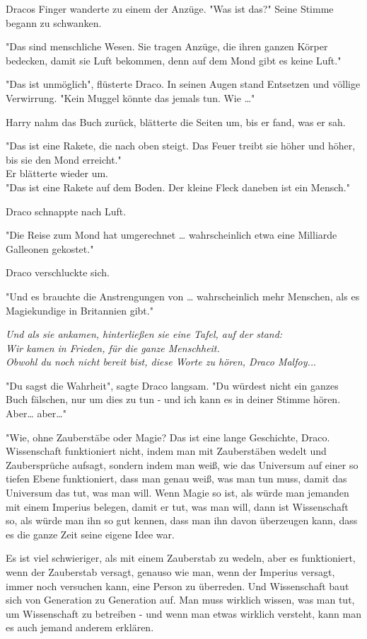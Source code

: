 {Dracos Finger wanderte zu einem der Anzüge. "Was ist das?" Seine Stimme begann zu schwanken.

"Das sind menschliche Wesen. Sie tragen Anzüge, die ihren ganzen Körper bedecken, damit sie Luft bekommen, denn auf dem Mond gibt es keine Luft."

"Das ist unmöglich", flüsterte Draco. In seinen Augen stand Entsetzen und völlige Verwirrung. "Kein Muggel könnte das jemals tun. Wie …"

Harry nahm das Buch zurück, blätterte die Seiten um, bis er fand, was er sah.

"Das ist eine Rakete, die nach oben steigt. Das Feuer treibt sie höher und höher, bis sie den Mond erreicht."\\ Er blätterte wieder um.\\ "Das ist eine Rakete auf dem Boden. Der kleine Fleck daneben ist ein Mensch."

Draco schnappte nach Luft.

"Die Reise zum Mond hat umgerechnet … wahrscheinlich etwa eine Milliarde Galleonen gekostet."

Draco verschluckte sich.

"Und es brauchte die Anstrengungen von … wahrscheinlich mehr Menschen, als es Magiekundige in Britannien gibt."

\emph{Und als sie ankamen, hinterließen sie eine Tafel, auf der stand:}\\ \emph{Wir kamen in Frieden, für die ganze Menschheit.}\\ \emph{Obwohl du noch nicht bereit bist, diese Worte zu hören, Draco Malfoy..}.

"Du sagst die Wahrheit", sagte Draco langsam. "Du würdest nicht ein ganzes Buch fälschen, nur um dies zu tun - und ich kann es in deiner Stimme hören. Aber… aber…"

"Wie, ohne Zauberstäbe oder Magie? Das ist eine lange Geschichte, Draco. Wissenschaft funktioniert nicht, indem man mit Zauberstäben wedelt und Zaubersprüche aufsagt, sondern indem man weiß, wie das Universum auf einer so tiefen Ebene funktioniert, dass man genau weiß, was man tun muss, damit das Universum das tut, was man will. Wenn Magie so ist, als würde man jemanden mit einem Imperius belegen, damit er tut, was man will, dann ist Wissenschaft so, als würde man ihn so gut kennen, dass man ihn davon überzeugen kann, dass es die ganze Zeit seine eigene Idee war.

Es ist viel schwieriger, als mit einem Zauberstab zu wedeln, aber es funktioniert, wenn der Zauberstab versagt, genauso wie man, wenn der Imperius versagt, immer noch versuchen kann, eine Person zu überreden. Und Wissenschaft baut sich von Generation zu Generation auf. Man muss wirklich wissen, was man tut, um Wissenschaft zu betreiben - und wenn man etwas wirklich versteht, kann man es auch jemand anderem erklären.

}
